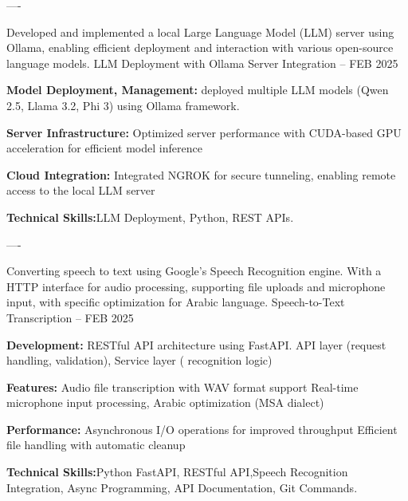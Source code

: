 \begin{cventries}
    \begin{singlespace}
----
\end{singlespace}

\cventry
    {Developed and implemented a local Large Language Model (LLM) server using Ollama, enabling efficient deployment and interaction with various open-source language models.} %
    {LLM Deployment with Ollama Server Integration} %
    {--} %
    {FEB 2025} %
    {
      \begin{cvitems} %
        \item \textbf{Model Deployment, Management:}{ deployed multiple LLM models (Qwen 2.5, Llama 3.2, Phi 3) using Ollama framework.}
        \item \textbf{Server Infrastructure:}{ Optimized server performance with CUDA-based GPU acceleration for efficient model inference}
        \item \textbf{Cloud Integration:}{ Integrated NGROK for secure tunneling, enabling remote access to the local LLM server}
        \item \textbf{Technical Skills:}{LLM Deployment, Python, REST APIs.}
      \end{cvitems}
    }
    
    \begin{singlespace}
----
\end{singlespace}

\cventry
    {Converting speech to text using Google's Speech Recognition engine. With a HTTP interface for audio processing, supporting file uploads and microphone input, with specific optimization for Arabic language.} %
    {Speech-to-Text Transcription} %
    {--} %
    {FEB 2025} %
    {
      \begin{cvitems} %
        \item \textbf{Development:}{ RESTful API architecture using FastAPI.
        API layer (request handling, validation), Service layer ( recognition logic)}
        \item \textbf{Features:}{ Audio file transcription with WAV format support
                Real-time microphone input processing, Arabic optimization (MSA dialect)}
        \item \textbf{Performance:}{ Asynchronous I/O operations for improved throughput Efficient file handling with automatic cleanup}
        \item \textbf{Technical Skills:}{Python FastAPI, RESTful API,Speech Recognition Integration, Async Programming, API Documentation, Git Commands.}
      \end{cvitems}
    }
    

\end{cventries}
